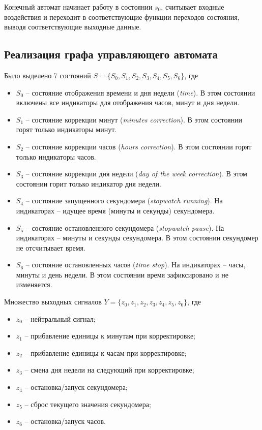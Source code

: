\documentclass[a4paper, final]{article}
\begin{document}
Конечный автомат начинает работу в состоянии $s_0$, считывает входные воздействия и переходит в соответствующие функции переходов состояния, выводя соответствующие выходные данные.

\subsection{Реализация графа управляющего автомата}
Было выделено 7 состояний $S = \{S_0, S_1, S_2, S_3, S_4, S_5, S_6\}$, где
\begin{itemize}
  \item $S_0$ -- состояние отображения времени и дня недели (\textit{time}). В этом состоянии включены все индикаторы для отображения часов, минут и дня недели.
  \item $S_1$ -- состояние коррекции минут (\textit{minutes correction}). В этом состоянии горят только индикаторы минут.
  \item $S_2$ -- состояние коррекции часов (\textit{hours correction}). В этом состоянии горят только индикаторы часов.
  \item $S_3$ -- состояние коррекции дня недели (\textit{day of the week correction}). В этом состоянии горит только индикатор дня недели.
  \item $S_4$ -- состояние запущенного секундомера (\textit{stopwatch running}). На индикаторах -- идущее время (минуты и секунды) секундомера.
  \item $S_5$ -- состояние остановленного секундомера (\textit{stopwatch pause}). На индикаторах -- минуты и секунды секундомера. В этом состоянии секундомер не отсчитывает время.
  \item $S_6$ -- состояние остановленных часов (\textit{time stop}). На индикаторах -- часы, минуты и день недели. В этом состоянии время зафиксировано и не изменяется.
\end{itemize}

Множество выходных сигналов $Y = \{z_0, z_1, z_2, z_3, z_4, z_5, z_6\}$, где
\begin{itemize}
  \item $z_0$ -- нейтральный сигнал;
  \item $z_1$ -- прибавление единицы к минутам при корректировке;
  \item $z_2$ -- прибавление единицы к часам при корректировке;
  \item $z_3$ -- смена дня недели на следующий при корректировке;
  \item $z_4$ -- остановка/запуск секундомера;
  \item $z_5$ -- сброс текущего значения секундомера;
  \item $z_6$ -- остановка/запуск часов.
\end{itemize}
\end{document}
